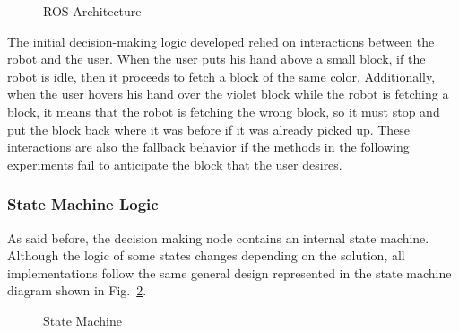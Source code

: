 \begin{figure}[H]%
    \centering
    
    \caption{ROS Architecture}
    \label{fig:ros_architecture}
\end{figure}

The initial decision-making logic developed relied on interactions between the robot and the user. When the user puts his hand above a small block, if the robot is idle, then it proceeds to fetch a block of the same color. Additionally, when the user hovers his hand over the violet block while the robot is fetching a block, it means that the robot is fetching the wrong block, so it must stop and put the block back where it was before if it was already picked up. These interactions are also the fallback behavior if the methods in the following experiments fail to anticipate the block that the user desires.

\subsubsection{State Machine Logic}

As said before, the decision making node contains an internal state machine. Although the logic of some states changes depending on the solution, all implementations follow the same general design represented in the state machine diagram shown in Fig.~\ref{fig:state_machine}.

\begin{figure}[H]%
    \centering
    
    \caption{State Machine}
    \label{fig:state_machine}
\end{figure}

